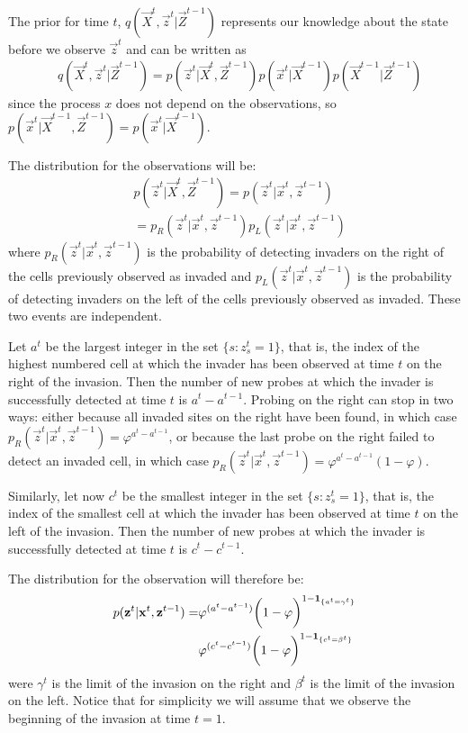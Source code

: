 The prior for time $t$, $q(\vec{X}^{t}, \vec{z}^t | \vec{Z}^{t-1})$ represents our knowledge about the state before we observe $\vec{z}^{t}$ and can be written as
\begin{align}
    & q(\vec{X}^{t}, \vec{z}^{t} | \vec{Z}^{t-1}) = p(\vec{z}^{t} | \vec{X}^{t}, \vec{Z}^{t-1}) p(\vec{x}^{t} | \vec{X}^{t-1}) p(\vec{X}^{t-1} | \vec{Z}^{t-1}) \label{eq:3}
\end{align}
since the process $x$ does not depend on the observations, so $p(\vec{x}^{t} | \vec{X}^{t-1}, \vec{Z}^{t-1}) = p(\vec{x}^{t} | \vec{X}^{t-1})$.

The distribution for the observations will be:
\begin{align*}
    & p(\vec{z}^{t} | \vec{X}^{t}, \vec{Z}^{t-1}) = p(\vec{z}^{t} | \vec{x}^{t}, \vec{z}^{t-1}) \\
    & = p_R(\vec{z}^{t} | \vec{x}^{t}, \vec{z}^{t-1}) p_L(\vec{z}^{t} | \vec{x}^{t}, \vec{z}^{t-1})
\end{align*}
where $p_R(\vec{z}^{t} | \vec{x}^{t}, \vec{z}^{t-1})$ is the probability of detecting invaders on the right of the cells previously observed as invaded and $p_L(\vec{z}^{t} | \vec{x}^{t}, \vec{z}^{t-1})$ is the probability of detecting invaders on the left of the cells previously observed as invaded. These two events are independent.

Let $a^{t}$ be the largest integer in the set $\{ s : z_s^{t} = 1 \}$, that is, the index of the highest numbered cell at which the invader has been observed at time $t$ on the right of the invasion. Then the number of new probes at which the invader is successfully detected at time $t$ is $a^{t} - a^{t-1}$. Probing on the right can stop in two ways: either because all invaded sites on the right have been found, in which case $p_R(\vec{z}^{t} | \vec{x}^{t}, \vec{z}^{t-1}) = \varphi^{a^{t} - a^{t-1}}$, or because the last probe on the right failed to detect an invaded cell, in which case $p_R(\vec{z}^{t} | \vec{x}^{t}, \vec{z}^{t-1}) = \varphi^{a^{t} - a^{t-1}} (1 - \varphi)$.

Similarly, let now $c^{t}$ be the smallest integer in the set $\{ s : z_s^{t} = 1 \}$, that is, the index of the smallest cell at which the invader has been observed at time $t$ on the left of the invasion. Then the number of new probes at which the invader is successfully detected at time $t$ is $c^{t} - c^{t-1}$.

The distribution for the observation will therefore be:
\begin{align*}
    p(\mathbf{z}^{t} | \mathbf{x}^{t}, \mathbf{z}^{t-1}) = &\varphi^{(a^{t} - a^{t-1})} \bigg(1 - \varphi \bigg)^{1-\mathbf{1}_{\{a^{t}=\gamma^{t}\}}}\\
    &\varphi^{(c^{t} - c^{t-1})} \bigg( 1 - \varphi \bigg)^{1-\mathbf{1}_{\{c^{t}=\beta^{t}\}}}
\end{align*}
were $\gamma^{t}$ is the limit of the invasion on the right and $\beta^{t}$ is the limit of the invasion on the left. Notice that for simplicity we will assume that we observe the beginning of the invasion at time $t=1$. 

